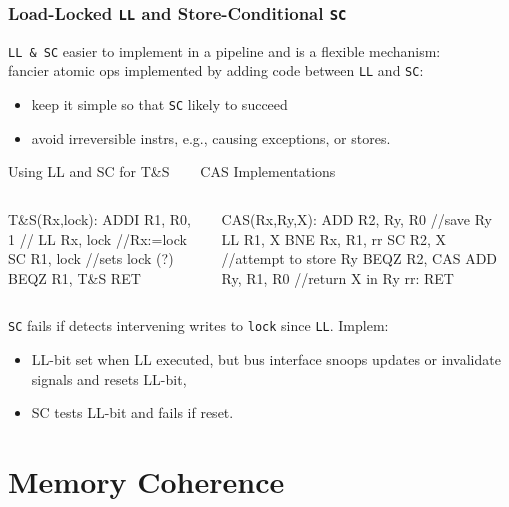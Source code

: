 \documentclass{beamer}
\newcommand{\emp}[1]{\textcolor{DikuRed}{ #1}}
\begin{document}
\begin{frame}[fragile,t]
\frametitle{Load-Locked {\tt LL} and Store-Conditional {\tt SC}}

\emp{\tt LL \& SC} easier to implement in a pipeline and is a flexible mechanism:\\
fancier atomic ops implemented by adding code between {\tt LL} and {\tt SC}:
\begin{itemize}
    \item keep it simple so that {\tt SC} likely to succeed
    \item avoid irreversible instrs, e.g., causing exceptions, or stores.
\end  {itemize}

\begin{block}{Using LL and SC for T\&S {\tt~~~} CAS Implementations}\vspace{-2ex}
\begin{columns}
\begin{colorcode}[fontsize=\scriptsize]
T\&S(Rx,lock):
    ADDI R1, R0, 1 //
    LL   Rx, lock  //Rx:=lock
    SC   R1, lock  //sets lock (?)
    BEQZ R1, T\&S
    RET


\end{colorcode} 
\begin{colorcode}[fontsize=\scriptsize]
CAS(Rx,Ry,X):
    ADD  R2, Ry, R0 //save Ry
    LL   R1, X
    BNE  Rx, R1, rr
    SC   R2, X      //attempt to store Ry
    BEQZ R2, CAS
    ADD  Ry, R1, R0 //return X in Ry
rr: RET
\end{colorcode} 
\end{columns}
\end{block}

{\tt SC} fails if detects intervening writes to {\tt lock} since {\tt LL}. Implem:
\begin{itemize}
    \item LL-bit set when LL executed, but bus interface snoops updates or 
            invalidate signals and resets LL-bit,
    \item SC tests LL-bit and fails if reset.
\end  {itemize}
\end{frame}


\section{Memory Coherence}
\end{document}
